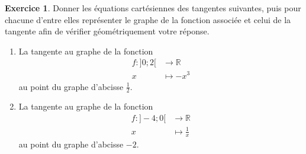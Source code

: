 \documentclass[a4paper,fontsize=13pt]{scrreprt}
\theoremstyle{plain}
\theoremstyle{definition}
\newtheorem{exo}[subsection]{Exercice}
\newtheorem*{solu}{Solution}
\newcommand{\rr}{\mathbb{R}}
\newcommand {\grille}{\draw[help lines] (\xmin,\ymin) grid (\xmax,\ymax);}
\newcommand {\axes} {
	\draw[thick, ->] (\xmin,0) -- (\xmax+1,0);
	\draw[thick, ->] (0,\ymin) -- (0,\ymax+1);
	\draw (0,\ymax+0.5) node [left] {$y$};
	\draw (\xmax+0.5, 0) node [below] {$x$};
	\draw[thick] (-0.15,1)--(0.15,1) (1,-0.15)--(1,0.15);
	\draw (0,1)node[left]{$1$} (1,0)node[below]{$1$};
}
\begin{document}
\begin{exo}
Donner les équations cartésiennes des tangentes suivantes, puis pour chacune d'entre elles représenter le graphe de la fonction associée et celui de la tangente afin de vérifier géométriquement votre réponse.
\begin{enumerate}
\item La tangente au graphe de la fonction
\begin{align*}
f : ]0;2[ &\to \rr \\
x &\mapsto -x^3
\end{align*}
au point du graphe d'abcisse $\frac{1}{2}$.
\item La tangente au graphe de la fonction
\begin{align*}
f : ]-4;0[ &\to \rr \\
x &\mapsto \frac{1}{x}
\end{align*}
au point du graphe d'abcisse $-2$.
\end{enumerate}
\end{exo}

\end{document}
